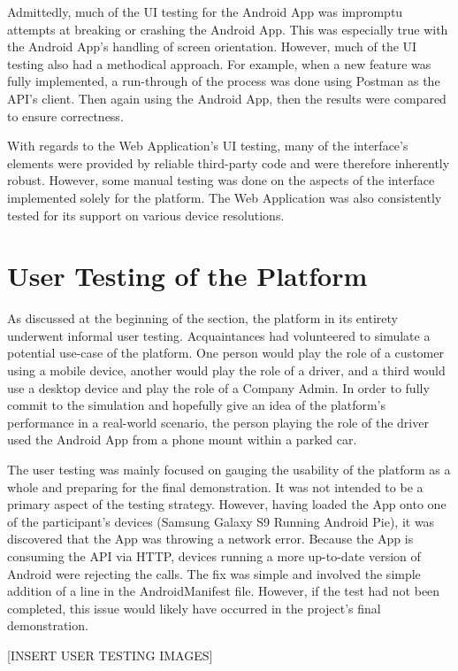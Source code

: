 Admittedly, much of the UI testing for the Android App was impromptu attempts at breaking or crashing the Android App. This was especially true with the Android App's handling of screen orientation. However, much of the UI testing also had a methodical approach. For example, when a new feature was fully implemented, a run-through of the process was done using Postman as the API's client. Then again using the Android App, then the results were compared to ensure correctness.

With regards to the Web Application's UI testing, many of the interface's elements were provided by reliable third-party code and were therefore inherently robust. However, some manual testing was done on the aspects of the interface implemented solely for the platform. The Web Application was also consistently tested for its support on various device resolutions.

\section{User Testing of the Platform}
As discussed at the beginning of the section, the platform in its entirety underwent informal user testing. Acquaintances had volunteered to simulate a potential use-case of the platform. One person would play the role of a customer using a mobile device, another would play the role of a driver, and a third would use a desktop device and play the role of a Company Admin. In order to fully commit to the simulation and hopefully give an idea of the platform's performance in a real-world scenario, the person playing the role of the driver used the Android App from a phone mount within a parked car.

The user testing was mainly focused on gauging the usability of the platform as a whole and preparing for the final demonstration. It was not intended to be a primary aspect of the testing strategy. However, having loaded the App onto one of the participant's devices (Samsung Galaxy S9 Running Android Pie), it was discovered that the App was throwing a network error. Because the App is consuming the API via HTTP, devices running a more up-to-date version of Android were rejecting the calls. The fix was simple and involved the simple addition of a line in the AndroidManifest file. However, if the test had not been completed, this issue would likely have occurred in the project's final demonstration.

[INSERT USER TESTING IMAGES]